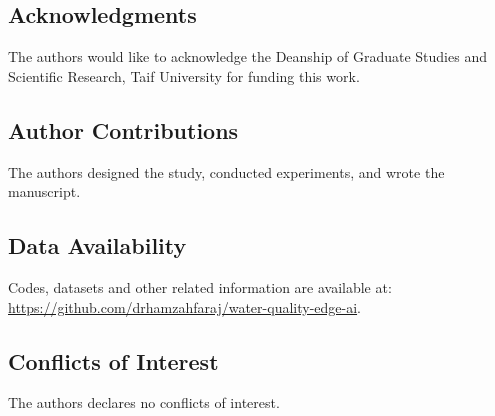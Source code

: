 \documentclass[12pt,a4paper]{article}
\begin{document}
\subsection*{Acknowledgments}
The authors would like to acknowledge the Deanship of Graduate Studies and Scientific Research, Taif University for funding this work.

\subsection*{Author Contributions}
The authors designed the study, conducted experiments, and wrote the manuscript.

\subsection*{Data Availability}
Codes, datasets and other related information are available at: \\ \url{https://github.com/drhamzahfaraj/water-quality-edge-ai}.

\subsection*{Conflicts of Interest}
The authors declares no conflicts of interest.


\end{document}
